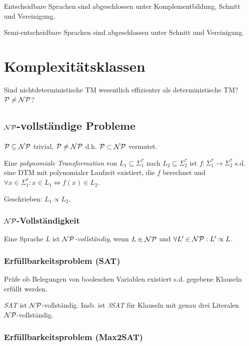 Entscheidbare Sprachen sind abgeschlossen unter Komplementbildung, Schnitt und Vereinigung.

\spacing

Semi-entscheidbare Sprachen sind abgeschlossen unter Schnitt und Vereinigung.

\section*{Komplexitätsklassen}

Sind nichtdeterministische TM wesentlich effizienter als deterministische TM? $\mathcal{P} \neq \mathcal{NP}$?

\subsection*{$\mathcal{NP}$-vollständige Probleme}

$\mathcal{P} \subseteq \mathcal{NP}$ trivial, $\mathcal{P} \neq \mathcal{NP}$ d.h. $\mathcal{P} \subset \mathcal{NP}$ vermutet.

\spacing

Eine \emph{polynomiale Transformation} von $L_1 \subseteq \Sigma_1^*$ nach $L_2 \subseteq \Sigma_2^*$ ist $f : \Sigma_1^* \to \Sigma_2^*$ s.d. eine DTM mit polynomialer Laufzeit existiert, die $f$ berechnet und $\forall x \in \Sigma_1^* : x \in L_1 \iff f(x) \in L_2$.

Geschrieben: $L_1 \propto L_2$.

\subsubsection*{$\mathcal{NP}$-Vollständigkeit}

Eine Sprache $L$ ist \emph{$\mathcal{NP}$-vollständig}, wenn $L \in \mathcal{NP}$ und $\forall L' \in  \mathcal{NP} : L' \propto L$.

\subsubsection*{Erfüllbarkeitsproblem (SAT)}

Prüfe ob Belegungen von booleschen Variablen existiert s.d. gegebene Klauseln erfüllt werden.

\spacing

\emph{SAT} ist $\mathcal{NP}$-vollständig. Insb. ist \emph{3SAT} für Klauseln mit genau drei Literalen $\mathcal{NP}$-vollständig.

\subsubsection*{Erfüllbarkeitsproblem (Max2SAT)}

